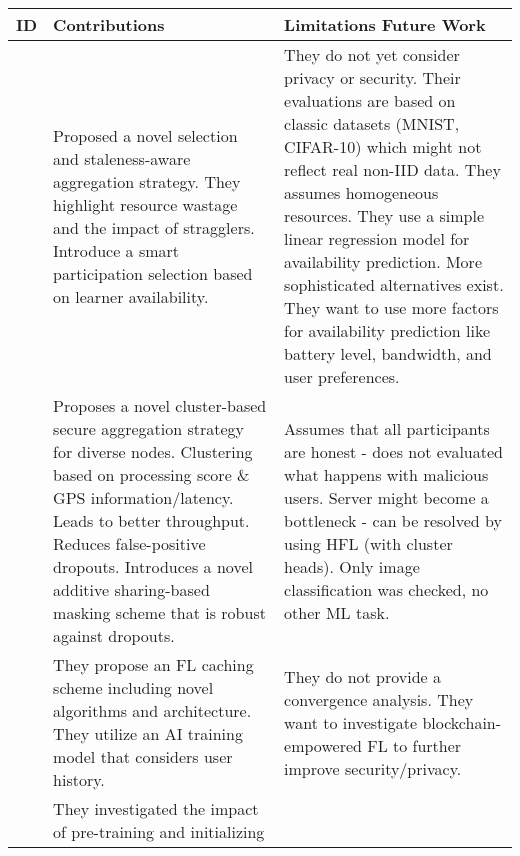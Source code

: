 \begin{changemargin}{-2cm}{0cm}
    \begin{tabular}{|c||m{0.4\paperwidth}|m{0.4\paperwidth}|}
        \hline
            ID & Contributions & Limitations Future Work \\
        \hline
            \cite{paper:refl_resource_efficient_fl}
            &
            Proposed a novel selection and staleness-aware aggregation strategy.
            They highlight resource wastage and the impact of stragglers.
            Introduce a smart participation selection based on learner availability.
            &
            They do not yet consider privacy or security.
            Their evaluations are based on classic datasets (MNIST, CIFAR-10) which might not reflect real non-IID data.
            They assumes homogeneous resources.
            They use a simple linear regression model for availability prediction.
            More sophisticated alternatives exist.
            They want to use more factors for availability prediction like battery level, bandwidth, and user preferences.
        \\
        \hline
            \cite{paper:cluster_based_secure_aggregation_for_fl}
            &
            Proposes a novel cluster-based secure aggregation strategy for diverse nodes.
            Clustering based on processing score \& GPS information/latency.
            Leads to better throughput.
            Reduces false-positive dropouts.
            Introduces a novel additive sharing-based masking scheme that is robust against dropouts.
            &
            Assumes that all participants are honest - does not evaluated what happens with malicious users.
            Server might become a bottleneck - can be resolved by using HFL (with cluster heads).
            Only image classification was checked, no other ML task.
        \\
        \hline
            \cite{paper:privacy_preserving_deep_fl_for_coop_hierarchical_caching_in_fog_computing}
            &
            They propose an FL caching scheme including novel algorithms and architecture.
            They utilize an AI training model that considers user history.
            &
            They do not provide a convergence analysis.
            They want to investigate blockchain-empowered FL to further improve security/privacy.
        \\
        \hline
            \cite{paper:model_pretraining_and_initialization_for_fl}
            &
            They investigated the impact of pre-training and initializing

\end{tabular}
\end{changemargin}
